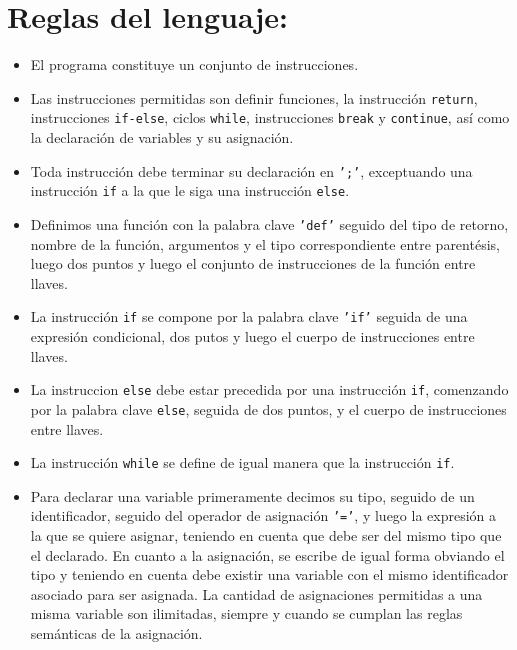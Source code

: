 \documentclass[twoside]{article}
\begin{document}
		
		
		
		
		\section{Reglas del lenguaje:}
		\begin{itemize}
			\item El programa constituye un conjunto de instrucciones.
			
			\item Las instrucciones permitidas son definir funciones, la instrucci\'on \texttt{return}, instrucciones \texttt{if-else}, ciclos \texttt{while}, instrucciones \texttt{break} y \texttt{continue}, as\'i como la declaraci\'on de variables y su asignaci\'on.
			
			\item Toda instrucci\'on debe terminar su declaraci\'on en \texttt{';'}, exceptuando una instrucci\'on \texttt{if} a la que le siga una instrucci\'on \texttt{else}.
			
			\item Definimos una funci\'on con la palabra clave \texttt{'def'} seguido del tipo de retorno, nombre de la funci\'on, argumentos y el tipo correspondiente entre parent\'esis, luego dos puntos y luego el conjunto de instrucciones de la funci\'on entre llaves.
			
			\item La instrucci\'on \texttt{if} se compone por la palabra clave \texttt{'if'} seguida de una expresi\'on condicional, dos putos y luego el cuerpo de instrucciones  entre llaves.
			
			\item La instruccion \texttt{else} debe estar precedida por una instrucci\'on \texttt{if}, comenzando por la palabra clave \texttt{else}, seguida de dos puntos, y el cuerpo de instrucciones entre llaves.
			
			\item La instrucci\'on \texttt{while} se define de igual manera que la instrucci\'on \texttt{if}.
			
			\item Para declarar una variable primeramente decimos su tipo, seguido de un identificador, seguido del operador de asignaci\'on \texttt{'='}, y luego la expresi\'on a la que se quiere asignar, teniendo en cuenta que debe ser del mismo tipo que el declarado.  En cuanto a la asignaci\'on, se escribe de igual forma obviando el tipo y teniendo en cuenta debe existir una variable con el mismo identificador asociado para ser asignada. La cantidad de asignaciones permitidas a una misma variable son ilimitadas, siempre y cuando se cumplan las reglas sem\'anticas de la asignaci\'on.
			

\end{itemize}
\end{document}
